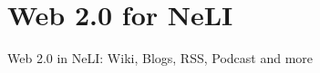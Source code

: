 \documentclass{beamer}
\begin{document}
\section{Web 2.0 for NeLI}
\begin{frame}[t]{Web 2.0 in NeLI: Wiki, Blogs, RSS, Podcast and more}
\vspace*{-0.25cm}


\end{frame}
\end{document}
